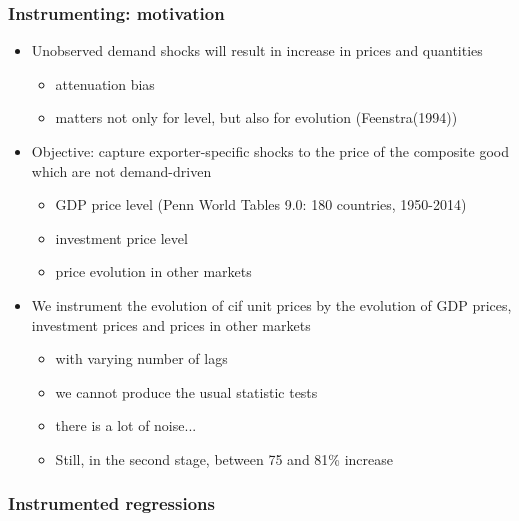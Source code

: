 \documentclass{beamer}
\begin{document}
\begin{frame}[plain]\frametitle{Instrumenting: motivation}
\vspace{0.3cm}
\begin{itemize}
	\item Unobserved demand shocks will result in increase in prices and quantities
	\begin{itemize}
		\item attenuation bias
		\item matters not only for level, but also for evolution (Feenstra(1994))
	\end{itemize}
	\item Objective: capture exporter-specific shocks to the price of the composite good which are not demand-driven
	\begin{itemize}
		\item GDP price level (Penn World Tables 9.0: 180 countries, 1950-2014)
		\item investment price level 
		\item price evolution in other markets
	\end{itemize}
	\item We instrument the evolution of cif unit prices by the evolution of GDP prices, investment prices and prices in other markets
	\begin{itemize}
		\item with varying number of lags
		\item we cannot produce the usual statistic tests
		\item there is a lot of noise...
		\item Still, in the second stage, between 75 and 81\% increase
	\end{itemize}
\end{itemize}
\end{frame}

\begin{frame}[plain]\frametitle{Instrumented regressions}
	\begin{figure}[h!]
		\begin{center}
			\setlength{\fboxrule}{1pt} %
			\setlength{\fboxsep}{.1in} %
		\end{center}
	\end{figure}
\end{frame}
\end{document}
